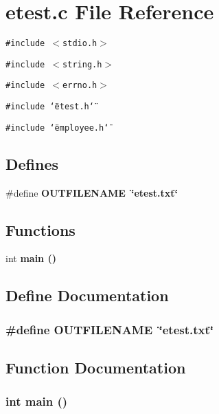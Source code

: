 \section{etest.c File Reference}
\label{etest_8c}
{\tt \#include $<$stdio.h$>$}\par
{\tt \#include $<$string.h$>$}\par
{\tt \#include $<$errno.h$>$}\par
{\tt \#include \char`\"{}etest.h\char`\"{}}\par
{\tt \#include \char`\"{}employee.h\char`\"{}}\par
\subsection*{Defines}
\begin{CompactItemize}
\item 
\#define \bf{OUTFILENAME}~\char`\"{}etest.txt\char`\"{}
\end{CompactItemize}
\subsection*{Functions}
\begin{CompactItemize}
\item 
int \bf{main} ()
\end{CompactItemize}


\subsection{Define Documentation}
\subsubsection{\setlength{\rightskip}{0pt plus 5cm}\#define OUTFILENAME~\char`\"{}etest.txt\char`\"{}}\label{etest_8c_b9366ad4235833c8da231456acc052f8}




\subsection{Function Documentation}
\subsubsection{\setlength{\rightskip}{0pt plus 5cm}int main ()}\label{etest_8c_e66f6b31b5ad750f1fe042a706a4e3d4}



